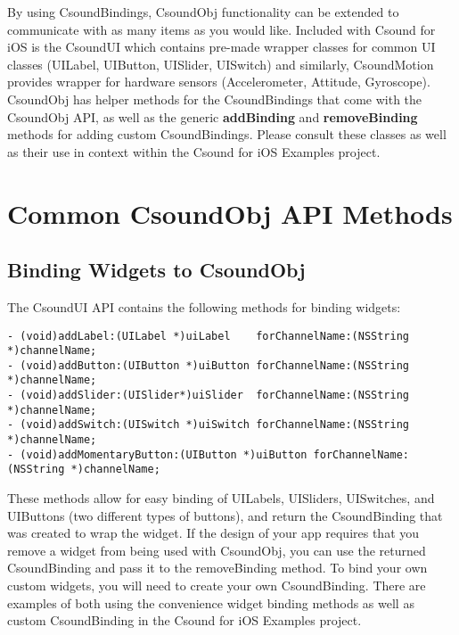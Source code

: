 \documentclass[11pt]{article}
\begin{document}
By using CsoundBindings, CsoundObj functionality can be extended to communicate with as many items as you would like. Included with Csound for iOS is the CsoundUI which contains pre-made wrapper classes for common UI classes (UILabel, UIButton, UISlider, UISwitch) and similarly, CsoundMotion provides wrapper for hardware sensors (Accelerometer, Attitude, Gyroscope).  CsoundObj has helper methods for the CsoundBindings that come with the CsoundObj API, as well as the generic \textbf{addBinding} and \textbf{removeBinding} methods for adding custom CsoundBindings. Please consult these classes as well as their use in context within the Csound for iOS Examples project.



\section{Common CsoundObj API Methods}

\subsection{Binding Widgets to CsoundObj}

The CsoundUI API contains the following methods for binding widgets:

\begin{lstlisting}[caption=Methods for Widget Binding]
- (void)addLabel:(UILabel *)uiLabel    forChannelName:(NSString *)channelName;
- (void)addButton:(UIButton *)uiButton forChannelName:(NSString *)channelName;
- (void)addSlider:(UISlider*)uiSlider  forChannelName:(NSString *)channelName;
- (void)addSwitch:(UISwitch *)uiSwitch forChannelName:(NSString *)channelName;
- (void)addMomentaryButton:(UIButton *)uiButton forChannelName:(NSString *)channelName;

\end{lstlisting}

These methods allow for easy binding of UILabels, UISliders, UISwitches, and UIButtons (two different types of buttons), and return the CsoundBinding that was created to wrap the widget. If the design of your app requires that you remove a widget from being used with CsoundObj, you can use the returned CsoundBinding and pass it to the removeBinding method. To bind your own custom widgets, you will need to create your own CsoundBinding.  There are examples of both using the convenience widget binding methods as well as custom CsoundBinding in the Csound for iOS Examples project.
\end{document}

